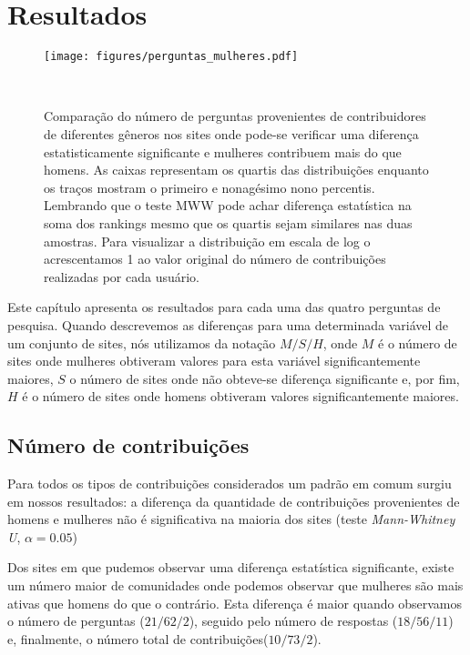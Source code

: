 \chapter{Resultados}
\label{ch:resultados}

\begin{figure}
  \texttt{[image: figures/perguntas\_mulheres.pdf]}
  \caption[Comparação do número de perguntas]{Comparação do número de perguntas provenientes de contribuidores de diferentes gêneros nos sites onde pode-se verificar uma diferença estatisticamente significante e mulheres contribuem mais do que homens. As caixas representam os quartis das distribuições enquanto os traços mostram o primeiro e nonagésimo nono percentis. Lembrando que o teste MWW pode achar diferença estatística na soma dos rankings mesmo que os quartis sejam similares nas duas amostras. Para visualizar a distribuição em escala de log o acrescentamos 1 ao valor original do número de contribuições realizadas por cada usuário. }~\label{fig:questions}
\end{figure}

Este capítulo apresenta os resultados para cada uma das quatro perguntas de pesquisa. Quando descrevemos as diferenças para uma determinada variável de um conjunto de sites, nós utilizamos da notação $M/S/H$, onde $M$ é o número de sites onde mulheres obtiveram valores para esta variável significantemente maiores, $S$ o número de sites onde não obteve-se diferença significante e, por fim, $H$ é o número de sites onde homens obtiveram valores significantemente maiores.

\section{Número de contribuições}
Para todos os tipos de contribuições considerados um padrão em comum surgiu em nossos resultados: a diferença da quantidade de contribuições provenientes de homens e mulheres não é significativa na maioria dos sites (teste \emph{Mann-Whitney U}, $\alpha = 0.05$)

Dos sites em que pudemos observar uma diferença estatística significante, existe um número maior de comunidades onde podemos observar que mulheres são mais ativas que homens do que o contrário. Esta diferença é maior quando observamos o número de perguntas ($21/62/2$), seguido pelo número de respostas ($18/56/11$) e, finalmente, o número total de contribuições($10/73/2$). 

